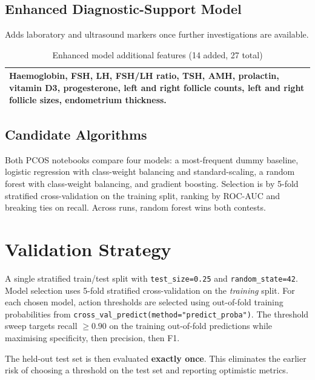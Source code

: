 \documentclass[11pt]{article}
\newcommand{\code}[1]{\texttt{\small #1}}
\begin{document}
\subsection{Enhanced Diagnostic-Support Model}

Adds laboratory and ultrasound markers once further investigations are available.

\begin{table}[H]
\centering
\caption{Enhanced model additional features (14 added, 27 total)}
\begin{tabularx}{\linewidth}{>{\raggedright\arraybackslash}X}
\toprule
Haemoglobin, FSH, LH, FSH/LH ratio, TSH, AMH, prolactin, vitamin D3, progesterone, left and right follicle counts, left and right follicle sizes, endometrium thickness. \\
\bottomrule
\end{tabularx}
\end{table}

\subsection{Candidate Algorithms}

Both PCOS notebooks compare four models: a most-frequent dummy baseline, logistic regression with class-weight balancing and standard-scaling, a random forest with class-weight balancing, and gradient boosting. Selection is by 5-fold stratified cross-validation on the training split, ranking by ROC-AUC and breaking ties on recall. Across runs, random forest wins both contests.

\section{Validation Strategy}

A single stratified train/test split with \code{test\_size=0.25} and \code{random\_state=42}. Model selection uses 5-fold stratified cross-validation on the \emph{training} split. For each chosen model, action thresholds are selected using out-of-fold training probabilities from \code{cross\_val\_predict(method="predict\_proba")}. The threshold sweep targets recall $\geq 0.90$ on the training out-of-fold predictions while maximising specificity, then precision, then F1.

The held-out test set is then evaluated \textbf{exactly once}. This eliminates the earlier risk of choosing a threshold on the test set and reporting optimistic metrics.
\end{document}
